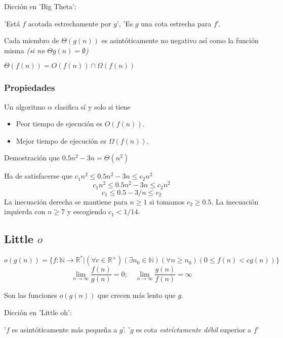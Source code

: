 \documentclass[tikz,11pt,fleqn]{book} %
\begin{document}
\begin{remark}Dicción en 'Big Theta':

    'Está $f$ acotada estrechamente por $g$', 'Es $g$ una cota estrecha para $f$'.
\end{remark}
Cada miembro de $\Theta(g(n))$ es asintóticamente no negativo así como la función misma \textit{(si no $\Theta{g(n)}=\emptyset$)}

\begin{theorem}
    $\Theta(f(n)) =O(f(n))\cap \Omega(f(n))$
\end{theorem}

\subsubsection{Propiedades}
Un algoritmo $\alpha$ clasifica sí y solo si tiene
\begin{itemize}
    \item Peor tiempo de ejecución es $O(f(n)).$
    \item Mejor tiempo de ejecución es $\Omega(f(n)).$
\end{itemize}

\begin{example}
    Demostración que $0.5n^2-3n=\Theta(n^2)$
    
    Ha de satisfacerse que $c_1n^2\le 0.5n^2-3n\le c_2n^2$
    $$
        c_1n^2\le 0.5n^2-3n\le c_2n^2
    $$$$
        c_1\le 0.5-3/n\le c_2
    $$
    La inecuación derecha se mantiene para $n\ge1$ si tomamos $c_2\ge0.5$. La inecuación izquierda con $n\ge7$ y escogiendo $c_1<1/14$.
\end{example}

\subsection{Little $o$}
\begin{definition}
$$
    o (g(n)) = \{ f : \mathbb N \to \mathbb R^* | (\forall c \in \mathbb R^+) (\exists n_0\in \mathbb N) (\forall n\ge n_0) ( 0 \le  f(n) < cg (n) ) \}
$$$$
    \lim_{n\to\infty}\frac{f(n)}{g(n)} = 0;\quad
    \lim_{n\to\infty}\frac{g(n)}{f(n)}= \infty
$$
\end{definition}
Son las funciones $o(g(n))$ que crecen más lento que $g$.
\begin{remark}Dicción en 'Little oh':

    '$f$ es asintóticamente más pequeña a $g$'. '$g$ es cota \textit{estríctamente débil} superior a $f$'
\end{remark}
\end{document}
